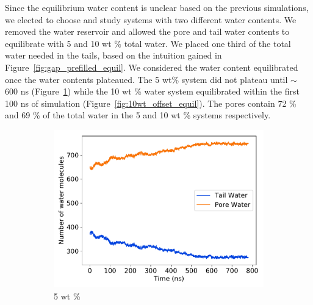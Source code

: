 \documentclass{article}
\begin{document}
  Since the equilibrium water content is unclear based on the previous
  simulations, we elected to choose and study systems with two different water
  contents. We removed the water reservoir and allowed the pore and tail water
  contents to equilibrate with 5 and 10 wt \% total water. We placed one third of
  the total water needed in the tails, based on the intuition gained in
  Figure~\ref{fig:gap_prefilled_equil}. We considered the water content
  equilibrated once the water contents plateaued. The 5 wt\% system did
  not plateau until $\sim$ 600 ns (Figure~\ref{fig:5wt_offset_equil})
  while the 10 wt \% water system equilibrated within the first 100 ns of 
  simulation (Figure~\ref{fig:10wt_offset_equil}).
  The pores contain 72 \% and 69 \% of the total water in the 5 and 10 wt \%
  systems respectively.

  \begin{figure}[!htb]
  \centering
  \begin{subfigure}{0.45\textwidth}
  \includegraphics[width=\textwidth]{5wt_offset_equil.pdf}
  \caption{5 wt \%}\label{fig:5wt_offset_equil}
  \end{subfigure}
  \begin{subfigure}{0.45\textwidth}

\end{subfigure}
\end{figure}
\end{document}
